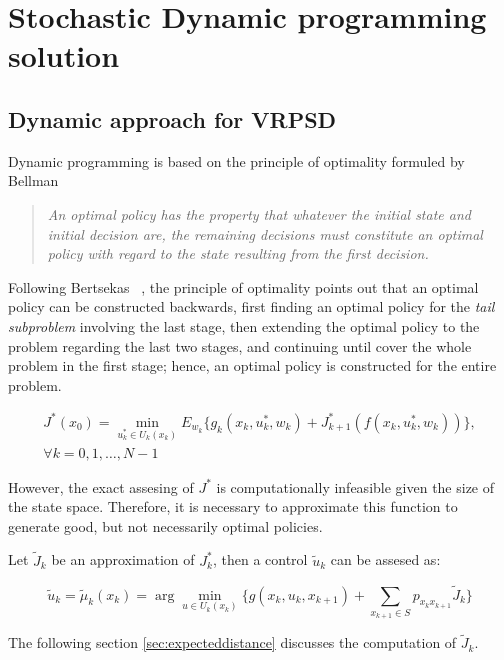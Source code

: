 \chapter{Stochastic Dynamic programming solution}
\label{chap:dp_methodology}


\section{Dynamic approach for VRPSD}

Dynamic programming is based on the principle of optimality formuled by Bellman ~\cite{bellman_theory_1954}

\begin{quote}
 \textit{An optimal policy has the property that whatever the initial state and initial decision are, the remaining decisions must constitute an optimal policy with regard to the state resulting from the first decision.}
\end{quote}

Following Bertsekas ~\cite{bertsekas_dynamic_1995}, the principle of optimality points out that an optimal policy can be constructed backwards, first finding an optimal policy for the \textit{tail subproblem} involving the last stage, then extending the optimal policy to the problem regarding the last two stages, and continuing until cover the whole problem in the first stage; hence, an optimal policy is constructed for the entire problem.

\begin{multline}
 J^*(x_0) = \min\limits_{u_k^*\in U_k(x_k)}E_{w_k}\biggr\{g_k(x_k,u_k^*,w_k)+J^*_{k+1}(f(x_k,u_k^*,w_k))\biggr\},\\
\forall k=0,1,\ldots,N-1
\end{multline}

However, the exact assesing of $J^*$ is computationally infeasible given the size of the state space. Therefore, it is necessary to approximate this function to generate good, but not necessarily optimal policies.

Let $\tilde{J}_k$ be an approximation of $J^*_k$, then a control $\tilde{u}_k$ can be assesed as:

\begin{equation}\label{eq:control_aprox}
\tilde{u}_k=\tilde{\mu}_k(x_k)=\arg \min\limits_{u\in U_k(x_k)} \biggr\{ g(x_k,u_k,x_{k+1}) + \sum_{x_{k+1}\in S}p_{x_kx_{k+1}}\tilde{J}_k\biggr\}
\end{equation}

The following section \ref{sec:expecteddistance} discusses the computation of $\tilde{J}_k$.

